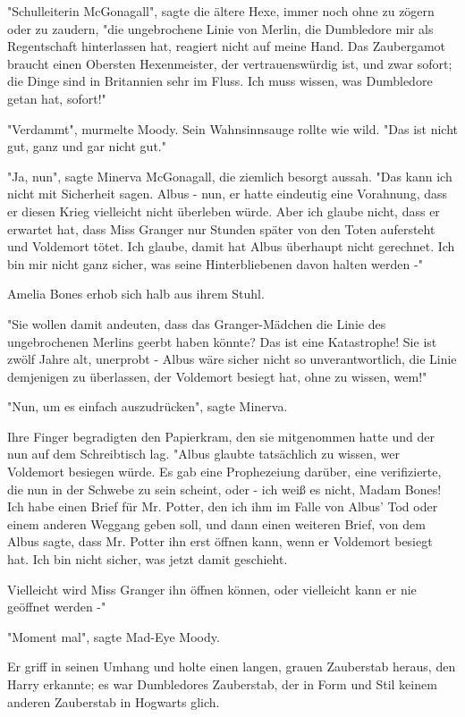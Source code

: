 {"Schulleiterin McGonagall", sagte die ältere Hexe, immer noch ohne zu zögern oder zu zaudern, "die ungebrochene Linie von Merlin, die Dumbledore mir als Regentschaft hinterlassen hat, reagiert nicht auf meine Hand. Das Zaubergamot braucht einen Obersten Hexenmeister, der vertrauenswürdig ist, und zwar sofort; die Dinge sind in Britannien sehr im Fluss. Ich muss wissen, was Dumbledore getan hat, sofort!"

"Verdammt", murmelte Moody. Sein Wahnsinnsauge rollte wie wild. "Das ist nicht gut, ganz und gar nicht gut."

"Ja, nun", sagte Minerva McGonagall, die ziemlich besorgt aussah. "Das kann ich nicht mit Sicherheit sagen. Albus - nun, er hatte eindeutig eine Vorahnung, dass er diesen Krieg vielleicht nicht überleben würde. Aber ich glaube nicht, dass er erwartet hat, dass Miss Granger nur Stunden später von den Toten aufersteht und Voldemort tötet. Ich glaube, damit hat Albus überhaupt nicht gerechnet. Ich bin mir nicht ganz sicher, was seine Hinterbliebenen davon halten werden -"

Amelia Bones erhob sich halb aus ihrem Stuhl.

"Sie wollen damit andeuten, dass das Granger-Mädchen die Linie des ungebrochenen Merlins geerbt haben könnte? Das ist eine Katastrophe! Sie ist zwölf Jahre alt, unerprobt - Albus wäre sicher nicht so unverantwortlich, die Linie demjenigen zu überlassen, der Voldemort besiegt hat, ohne zu wissen, wem!"

"Nun, um es einfach auszudrücken", sagte Minerva.

Ihre Finger begradigten den Papierkram, den sie mitgenommen hatte und der nun auf dem Schreibtisch lag. "Albus glaubte tatsächlich zu wissen, wer Voldemort besiegen würde. Es gab eine Prophezeiung darüber, eine verifizierte, die nun in der Schwebe zu sein scheint, oder - ich weiß es nicht, Madam Bones! Ich habe einen Brief für Mr. Potter, den ich ihm im Falle von Albus' Tod oder einem anderen Weggang geben soll, und dann einen weiteren Brief, von dem Albus sagte, dass Mr. Potter ihn erst öffnen kann, wenn er Voldemort besiegt hat. Ich bin nicht sicher, was jetzt damit geschieht.

Vielleicht wird Miss Granger ihn öffnen können, oder vielleicht kann er nie geöffnet werden -"

"Moment mal", sagte Mad-Eye Moody.

Er griff in seinen Umhang und holte einen langen, grauen Zauberstab heraus, den Harry erkannte; es war Dumbledores Zauberstab, der in Form und Stil keinem anderen Zauberstab in Hogwarts glich.

}
